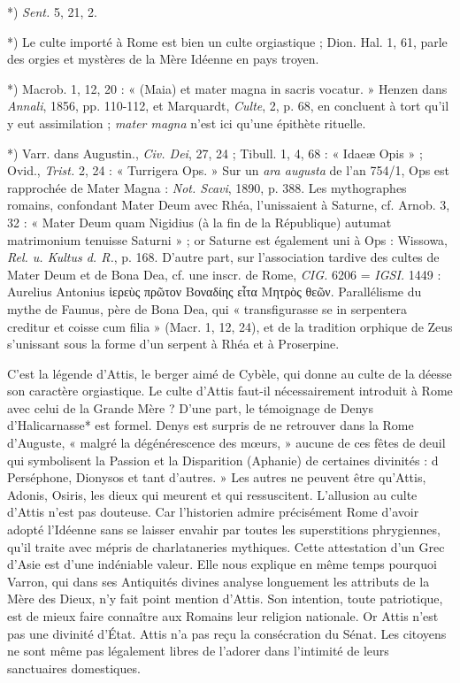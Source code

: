 \documentclass[a4paper, 11pt, oneside, polutonikogreek, french]{article}
\begin{document}
*) \emph{Sent.} 5, 21, 2.

*) Le culte importé à Rome est bien un culte orgiastique ; Dion. Hal. 1, 61, parle des orgies et mystères de la Mère Idéenne en pays troyen.

*) Macrob. 1, 12, 20 : « (Maia) et mater magna in sacris vocatur. » Henzen dans \emph{Annali}, 1856, pp. 110-112, et Marquardt, \emph{Culte}, 2, p. 68, en concluent à tort qu'il y eut assimilation ; \emph{mater magna} n'est ici qu'une épithète rituelle.

*) Varr. dans Augustin., \emph{Civ. Dei}, 27, 24 ; Tibull. 1, 4, 68 : « Idaeæ Opis » ; Ovid., \emph{Trist.} 2, 24 : « Turrigera Ops. » Sur un \emph{ara augusta} de l'an 754/1, Ops est rapprochée de Mater Magna : \emph{Not. Scavi}, 1890, p. 388. Les mythographes romains, confondant Mater Deum avec Rhéa, l'unissaient à Saturne, cf. Arnob. 3, 32 : « Mater Deum quam Nigidius (à la fin de la République) autumat matrimonium tenuisse Saturni » ; or Saturne est également uni à Ops : Wissowa, \emph{Rel. u. Kultus d. R.}, p. 168. D'autre part, sur l'association tardive des cultes de Mater Deum et de Bona Dea, cf. une inscr. de Rome, \emph{CIG.} 6206 = \emph{IGSI.} 1449 : Aurelius Antonius ἱερεὺς πρῶτον Βοναδίης εἶτα Μητρὸς θεῶν. Parallélisme du mythe de Faunus, père de Bona Dea, qui « transfigurasse se in serpentera creditur et coisse cum filia » (Macr. 1, 12, 24), et de la tradition orphique de Zeus s'unissant sous la forme d'un serpent à Rhéa et à Proserpine.

C'est la légende d'Attis, le berger aimé de Cybèle, qui donne au culte de la déesse son caractère orgiastique. Le culte d'Attis faut-il nécessairement introduit à Rome avec celui de la Grande Mère ? D'une part, le témoignage de Denys d'Halicarnasse* est formel. Denys est surpris de ne retrouver dans la Rome d'Auguste, « malgré la dégénérescence des mœurs, » aucune de ces fêtes de deuil qui symbolisent la Passion et la Disparition (Aphanie) de certaines divinités : d Perséphone, Dionysos et tant d'autres. » Les autres ne peuvent être qu'Attis, Adonis, Osiris, les dieux qui meurent et qui ressuscitent. L'allusion au culte d'Attis n'est pas douteuse. Car l'historien admire précisément Rome d'avoir adopté l'Idéenne sans se laisser envahir par toutes les superstitions phrygiennes, qu'il traite avec mépris de charlataneries mythiques. Cette attestation d'un Grec d'Asie est d'une indéniable valeur. Elle nous explique en même temps pourquoi Varron, qui dans ses Antiquités divines analyse longuement les attributs de la Mère des Dieux, n'y fait point mention d'Attis. Son intention, toute patriotique, est de mieux faire connaître aux Romains leur religion nationale. Or Attis n'est pas une divinité d'État. Attis n'a pas reçu la consécration du Sénat. Les citoyens ne sont même pas légalement libres de l'adorer dans l'intimité de leurs sanctuaires domestiques.
\end{document}
